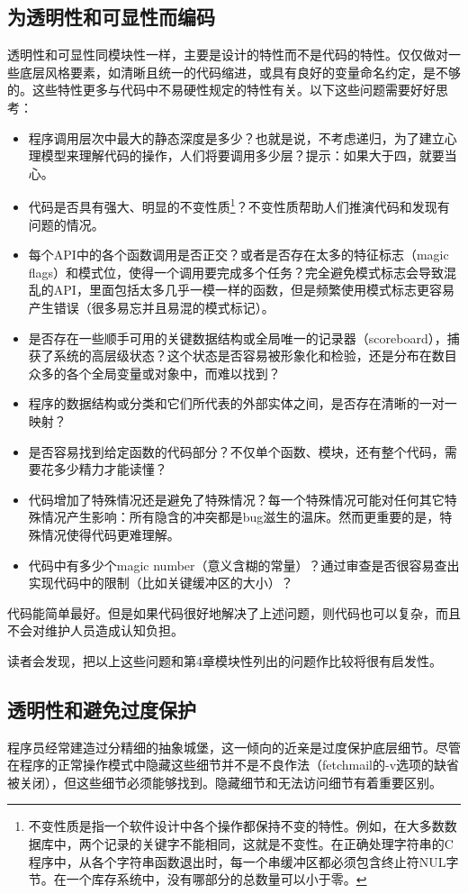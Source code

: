 \documentclass[12pt,oneside]{book}
\begin{document}
\subsection{为透明性和可显性而编码}
透明性和可显性同模块性一样，主要是设计的特性而不是代码的特性。仅仅做对一些底层风格要素，如清晰且统一的代码缩进，或具有良好的变量命名约定，是不够的。这些特性更多与代码中不易硬性规定的特性有关。以下这些问题需要好好思考：
\begin{itemize}
\item 程序调用层次中最大的静态深度是多少？也就是说，不考虑递归，为了建立心理模型来理解代码的操作，人们将要调用多少层？提示：如果大于四，就要当心。
\item 代码是否具有强大、明显的不变性质\footnote{不变性质是指一个软件设计中各个操作都保持不变的特性。例如，在大多数数据库中，两个记录的关键字不能相同，这就是不变性。在正确处理字符串的C程序中，从各个字符串函数退出时，每一个串缓冲区都必须包含终止符NUL字节。在一个库存系统中，没有哪部分的总数量可以小于零。}？不变性质帮助人们推演代码和发现有问题的情况。
\item 每个API中的各个函数调用是否正交？或者是否存在太多的特征标志（magic flags）和模式位，使得一个调用要完成多个任务？完全避免模式标志会导致混乱的API，里面包括太多几乎一模一样的函数，但是频繁使用模式标志更容易产生错误（很多易忘并且易混的模式标记）。
\item 是否存在一些顺手可用的关键数据结构或全局唯一的记录器（scoreboard），捕获了系统的高层级状态？这个状态是否容易被形象化和检验，还是分布在数目众多的各个全局变量或对象中，而难以找到？
\item 程序的数据结构或分类和它们所代表的外部实体之间，是否存在清晰的一对一映射？
\item 是否容易找到给定函数的代码部分？不仅单个函数、模块，还有整个代码，需要花多少精力才能读懂？
\item 代码增加了特殊情况还是避免了特殊情况？每一个特殊情况可能对任何其它特殊情况产生影响：所有隐含的冲突都是bug滋生的温床。然而更重要的是，特殊情况使得代码更难理解。
\item 代码中有多少个magic number（意义含糊的常量）？通过审查是否很容易查出实现代码中的限制（比如关键缓冲区的大小）？
\end{itemize}

代码能简单最好。但是如果代码很好地解决了上述问题，则代码也可以复杂，而且不会对维护人员造成认知负担。

读者会发现，把以上这些问题和第4章模块性列出的问题作比较将很有启发性。


\subsection{透明性和避免过度保护}
程序员经常建造过分精细的抽象城堡，这一倾向的近亲是过度保护底层细节。尽管在程序的正常操作模式中隐藏这些细节并不是不良作法（fetchmail的-v选项的缺省被关闭），但这些细节必须能够找到。隐藏细节和无法访问细节有着重要区别。
\end{document}
